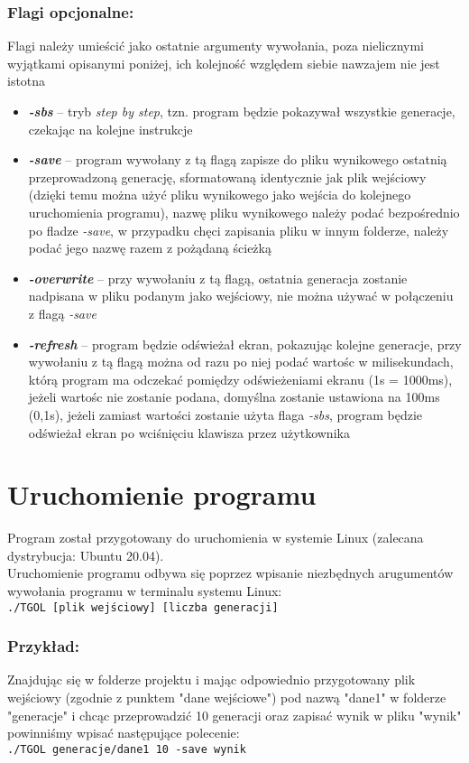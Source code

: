 \documentclass[11pt,a4paper]{report}
\begin{document}
\subsubsection {Flagi opcjonalne:}
Flagi należy umieścić jako ostatnie argumenty wywołania, poza nielicznymi wyjątkami opisanymi poniżej, ich kolejność względem siebie nawzajem nie jest istotna
\begin {itemize}
\item \textsl{\textbf{-sbs}} -- tryb \textsl {step by step}, tzn. program będzie pokazywał wszystkie generacje, czekając na kolejne instrukcje
\item \textsl{\textbf{-save}} -- program wywołany z tą flagą zapisze do pliku wynikowego ostatnią przeprowadzoną generację, sformatowaną identycznie jak plik wejściowy (dzięki temu można użyć pliku wynikowego jako wejścia do kolejnego uruchomienia programu), nazwę pliku wynikowego należy podać bezpośrednio po fladze \textsl{-save}, w przypadku chęci zapisania pliku w innym folderze, należy podać jego nazwę razem z pożądaną ścieżką
\item \textsl{\textbf{-overwrite}} -- przy wywołaniu z tą flagą, ostatnia generacja zostanie nadpisana w pliku podanym jako wejściowy, nie można używać w połączeniu z flagą \textsl{-save}
\item \textsl{\textbf{-refresh}} -- program będzie odświeżał ekran, pokazując kolejne generacje, przy wywołaniu z tą flagą można od razu po niej podać wartośc w milisekundach, którą program ma odczekać pomiędzy odświeżeniami ekranu (1s = 1000ms), jeżeli wartośc nie zostanie podana, domyślna zostanie ustawiona na 100ms (0,1s), jeżeli zamiast wartości zostanie użyta flaga \textsl{-sbs}, program będzie odświeżał ekran po wciśnięciu klawisza przez użytkownika
\end {itemize}

\section{Uruchomienie programu}\label{sec:teskt}
Program został przygotowany do uruchomienia w systemie Linux (zalecana dystrybucja: Ubuntu 20.04).\\
Uruchomienie programu odbywa się poprzez wpisanie niezbędnych arugumentów wywołania programu w terminalu systemu Linux:\\
\texttt{./TGOL [plik wejściowy] [liczba generacji]}
\subsubsection{Przykład:}
Znajdując się w folderze projektu i mając odpowiednio przygotowany plik wejściowy (zgodnie z punktem "dane wejściowe") pod nazwą "dane1" w folderze "generacje" i chcąc przeprowadzić 10 generacji oraz zapisać wynik w pliku "wynik" powinniśmy wpisać następujące polecenie:\\
\texttt{./TGOL generacje/dane1 10 -save wynik}
\end{document}
